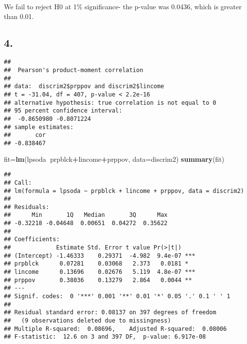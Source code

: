 \documentclass[
]{article}
\newenvironment{Shaded}{\begin{snugshade}}{\end{snugshade}}
\newcommand{\CommentTok}[1]{\textcolor[rgb]{0.56,0.35,0.01}{\textit{#1}}}
\newcommand{\DataTypeTok}[1]{\textcolor[rgb]{0.13,0.29,0.53}{#1}}
\newcommand{\KeywordTok}[1]{\textcolor[rgb]{0.13,0.29,0.53}{\textbf{#1}}}
\newcommand{\NormalTok}[1]{#1}
\newcommand{\OperatorTok}[1]{\textcolor[rgb]{0.81,0.36,0.00}{\textbf{#1}}}
\newcommand{\StringTok}[1]{\textcolor[rgb]{0.31,0.60,0.02}{#1}}
\begin{document}
We fail to reject H0 at 1\% significance- the p-value was 0.0436, which
is greater than 0.01.

\hypertarget{section-3}{%
\subsection{4.}\label{section-3}}

\begin{Shaded}
\end{Shaded}

\begin{verbatim}
## 
##  Pearson's product-moment correlation
## 
## data:  discrim2$prppov and discrim2$lincome
## t = -31.04, df = 407, p-value < 2.2e-16
## alternative hypothesis: true correlation is not equal to 0
## 95 percent confidence interval:
##  -0.8650980 -0.8071224
## sample estimates:
##       cor 
## -0.838467
\end{verbatim}

\begin{Shaded}
\begin{Highlighting}[]
\NormalTok{fit=}\KeywordTok{lm}\NormalTok{(lpsoda}\OperatorTok{~}\NormalTok{prpblck}\OperatorTok{+}\NormalTok{lincome}\OperatorTok{+}\NormalTok{prppov, }\DataTypeTok{data=}\NormalTok{discrim2)}
\KeywordTok{summary}\NormalTok{(fit) }
\end{Highlighting}
\end{Shaded}

\begin{verbatim}
## 
## Call:
## lm(formula = lpsoda ~ prpblck + lincome + prppov, data = discrim2)
## 
## Residuals:
##      Min       1Q   Median       3Q      Max 
## -0.32218 -0.04648  0.00651  0.04272  0.35622 
## 
## Coefficients:
##             Estimate Std. Error t value Pr(>|t|)    
## (Intercept) -1.46333    0.29371  -4.982  9.4e-07 ***
## prpblck      0.07281    0.03068   2.373   0.0181 *  
## lincome      0.13696    0.02676   5.119  4.8e-07 ***
## prppov       0.38036    0.13279   2.864   0.0044 ** 
## ---
## Signif. codes:  0 '***' 0.001 '**' 0.01 '*' 0.05 '.' 0.1 ' ' 1
## 
## Residual standard error: 0.08137 on 397 degrees of freedom
##   (9 observations deleted due to missingness)
## Multiple R-squared:  0.08696,    Adjusted R-squared:  0.08006 
## F-statistic:  12.6 on 3 and 397 DF,  p-value: 6.917e-08
\end{verbatim}
\end{document}
